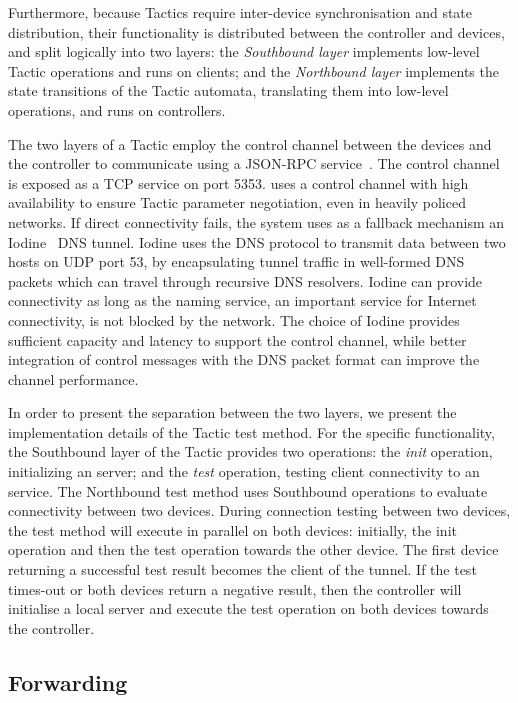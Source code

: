 Furthermore, because \signpost Tactics require inter-device synchronisation and
state distribution, their functionality is distributed between the \signpost
controller and \signpost devices, and split logically into two layers: the
\emph{Southbound layer} implements low-level Tactic operations and runs on
\signpost clients; and the \emph{Northbound layer} implements the state
transitions of the Tactic automata, translating them into low-level operations,
and runs on \signpost controllers. 

The two layers of a Tactic employ the control channel between the devices and
the \signpost controller to communicate using a JSON-RPC
service~.  The control channel is exposed as a TCP service on
port 5353.  \signpost uses a control channel with high availability to
ensure Tactic parameter negotiation, even in heavily policed networks.  If
direct connectivity fails, the system uses as a fallback mechanism an
Iodine~ DNS tunnel. Iodine uses the DNS protocol to transmit
data between two hosts on UDP port 53, by encapsulating tunnel traffic in
well-formed DNS packets which can travel through recursive DNS resolvers.
Iodine can provide connectivity as long as the naming service, an important
service for Internet connectivity, is not blocked by the network. The choice of
Iodine provides sufficient capacity and latency to support the \signpost
control channel, while better integration of control messages with the DNS
packet format can improve the channel performance. 

In order to present the separation between the two layers, we present the
implementation details of the  \openvpn Tactic test method. For the specific
functionality, the Southbound layer of the Tactic provides two operations: the
\textit{init} operation, initializing an \openvpn server; and the \textit{test}
operation, testing client connectivity to an \openvpn service. The Northbound
test method uses Southbound operations to evaluate connectivity between two
devices. During connection testing between two devices, the test method will execute
in
parallel on both devices: initially, the init operation and then the test
operation towards the other device.  The first device returning a successful test
result becomes the client of the \openvpn tunnel.  If the test times-out or both
devices return a negative result,  then the controller will initialise a local
\openvpn server and execute the test operation on both devices towards the
controller.

\subsection{Forwarding} \label{sec:sp-forwarding}

